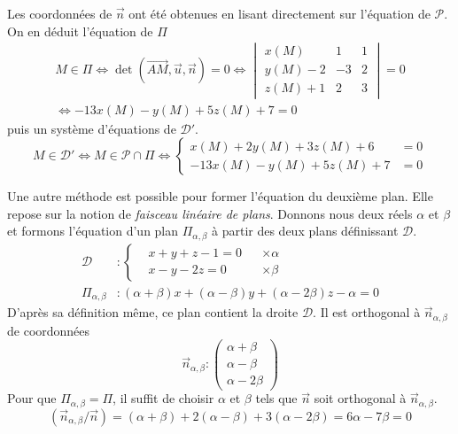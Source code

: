 Les coordonnées de $\overrightarrow n$ ont été obtenues en lisant directement sur l'équation de $\mathcal{P}$. On en déduit l'équation de $\Pi$
\begin{multline*}
 M\in \Pi\Leftrightarrow \det(\overrightarrow{AM},\overrightarrow u, \overrightarrow n)=0
\Leftrightarrow
\begin{vmatrix}
 x(M)    & 1  & 1  \\
 y(M) -2 & -3 & 2  \\
 z(M)+1  & 2  & 3
\end{vmatrix} = 0 \\
\Leftrightarrow
-13x(M)-y(M)+5z(M)+ 7 =0
\end{multline*}
puis un système d'équations de $\mathcal{D}'$.
\begin{displaymath}
 M\in \mathcal{D}'\Leftrightarrow M \in \mathcal{P}\cap \Pi
\Leftrightarrow
\left\lbrace 
\begin{aligned}
 x(M) + 2y(M) + 3z(M)+6 &= 0\\
 -13x(M)-y(M)+5z(M)+7 &= 0
\end{aligned}
\right. 
\end{displaymath}

Une autre méthode est possible pour former l'équation du deuxième plan. Elle repose sur la notion de \emph{faisceau linéaire de plans}.\newline
Donnons nous deux réels $\alpha$ et $\beta$ et formons l'équation d'un plan $\Pi_{\alpha, \beta}$ à partir des deux plans définissant $\mathcal D$.
\begin{align*}
 \mathcal D &:
\left\lbrace 
\begin{aligned}
 &x+y+z-1 =0  & &\times \alpha \\
 &x-y-2z = 0  & &\times \beta
\end{aligned}
\right. \\
\Pi_{\alpha, \beta} &: 
(\alpha + \beta)x + (\alpha-\beta)y + (\alpha -2\beta)z -\alpha =0
\end{align*}
D'après sa définition même, ce plan contient la droite $\mathcal D$. Il est orthogonal à $\overrightarrow n_{\alpha , \beta}$ de coordonnées
\begin{displaymath}
 \overrightarrow n_{\alpha , \beta} :
\begin{pmatrix}
 \alpha + \beta \\ \alpha - \beta \\ \alpha -2 \beta
\end{pmatrix}
\end{displaymath}
Pour que $\Pi_{\alpha, \beta} = \Pi$, il suffit de choisir $\alpha$ et $\beta$ tels que $\overrightarrow n$ soit orthogonal à $\overrightarrow n_{\alpha , \beta}$.
\begin{displaymath}
 (\overrightarrow n_{\alpha , \beta}/\overrightarrow n) = 
(\alpha + \beta) +2( \alpha - \beta) + 3(\alpha -2 \beta)=6\alpha -7\beta = 0
\end{displaymath}
 
